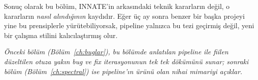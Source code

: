 \noindent
Sonuç olarak bu bölüm, INNATE'in arkasındaki teknik kararların değil,
o kararların \emph{nasıl alındığının} kaydıdır. Eğer üç ay sonra
benzer bir başka projeyi yine bu prensiplerle yürütebiliyorsak,
pipeline yalnızca bu tezi geçirmiş değil, yeni bir çalışma stilini
kalıcılaştırmış olur.

\bigskip
\noindent
\textit{Önceki bölüm (Bölüm~\ref{ch:buglar}), bu bölümde anlatılan
pipeline ile fiilen düzeltilen otuza yakın bug ve fix iterasyonunun
tek tek dökümünü sunar; sonraki bölüm (Bölüm~\ref{ch:spectral})
ise pipeline'ın ürünü olan nihai mimariyi açıklar.}
